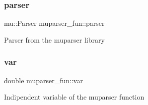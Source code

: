 \subsubsection{\texorpdfstring{parser}{parser}}
{\footnotesize\ttfamily mu\+::\+Parser muparser\+\_\+fun\+::parser\hspace{0.3cm}{\ttfamily [private]}}

Parser from the muparser library \mbox{\label{group__MuParser_gac4fe6d4c1437a4f66039268cdd304b75}} 
\subsubsection{\texorpdfstring{var}{var}}
{\footnotesize\ttfamily double muparser\+\_\+fun\+::var\hspace{0.3cm}{\ttfamily [private]}}

Indipendent variable of the muparser function 